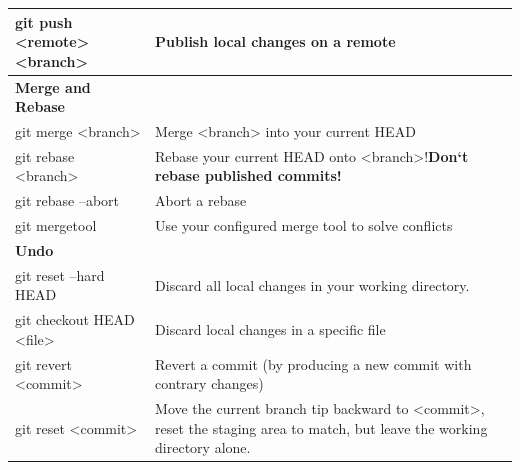 \begin{longtable}{| p{} | p{} |}
	git push <remote> <branch>&
	Publish local changes on a remote
	\\ \hline \hline
	
	\textbf{ Merge and Rebase}&
	\\\hline 
	
	\hline
	git merge <branch>&
	Merge <branch> into your current HEAD
	\\ \hline 
	
	git rebase <branch>& 
	Rebase your current HEAD onto <branch>!\textbf{Don‘t rebase published commits!}
	\\ \hline 
	
	git rebase --abort&
	Abort a rebase
	\\ \hline 
	
	git mergetool& 
	Use your configured merge tool to solve conflicts
	\\ \hline \hline
	
	\textbf{Undo}&
	\\\hline 
	
	\hline
	git reset --hard HEAD&
	Discard all local changes in your working directory.
	\\ \hline  
	
	git checkout HEAD <file>&
	Discard local changes in a specific file
	\\ \hline   
	
	git revert <commit>&
	Revert a commit (by producing a new commit with contrary changes)
	\\ \hline    
	
	git reset <commit>&
	Move the current branch tip backward to <commit>, reset the staging area to match, but leave the working directory alone. 
	\\ \hline
\end{longtable}
